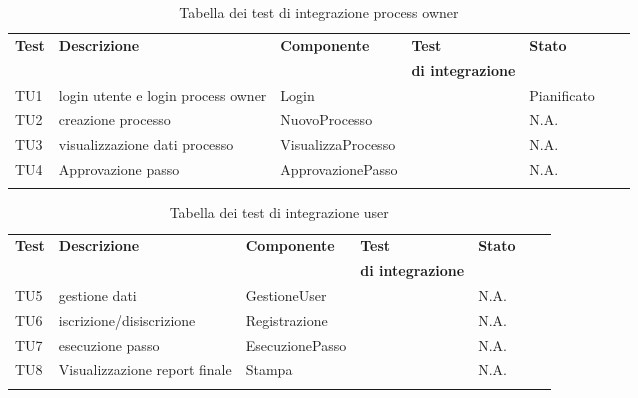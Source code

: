 \begin{longtable}{lllllXr}
\toprule
\textbf{Test} & \textbf{Descrizione} & \textbf{Componente} & \textbf{Test} & \textbf{Stato}\\
&&&\textbf{di integrazione}&\\
\toprule
TU1&login utente e login process owner &Login & & Pianificato\\
\midrule
TU2&creazione processo&NuovoProcesso&&N.A.\\
\midrule
TU3&visualizzazione dati processo&VisualizzaProcesso&&N.A.\\
\midrule
TU4&Approvazione passo&ApprovazionePasso&&N.A.\\
\bottomrule
\caption{Tabella dei test di integrazione process owner}
\end{longtable}

\begin{longtable}{lllllXr}
\toprule
\textbf{Test} & \textbf{Descrizione} & \textbf{Componente} & \textbf{Test} & \textbf{Stato}\\
&&&\textbf{di integrazione}&\\
\toprule
TU5&gestione dati&GestioneUser&&N.A.\\
\midrule
TU6&iscrizione/disiscrizione&Registrazione&&N.A.\\
\midrule
TU7&esecuzione passo&EsecuzionePasso&&N.A.\\
\midrule
TU8&Visualizzazione report finale&Stampa&&N.A.\\
\bottomrule
\caption{Tabella dei test di integrazione user}
\end{longtable}